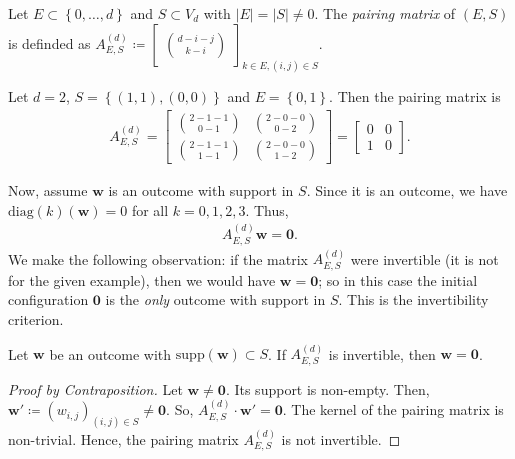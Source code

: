 \begin{definition}
    Let \( E \subset \left\{ 0, \dots, d \right\} \) and \( S \subset V_d \) with \( \lvert E \rvert = \lvert S \rvert \neq 0 \). The \emph{pairing matrix} of \( (E,S) \) is definded as \( A^{(d)}_{E,S} \coloneqq \begin{bmatrix} \binom{d-i-j}{k-i} \end{bmatrix}_{k \in E, (i,j) \in S} \).
\end{definition}

\begin{example}
    Let \( d = 2 \), \( S = \left\{ (1,1), (0,0) \right\} \) and \( E = \left\{ 0,1 \right\} \). Then the pairing matrix is
    \begin{align*}
        A^{(d)}_{E,S}  = \begin{bmatrix}
            \binom{2-1-1}{0-1} & \binom{2-0-0}{0-2} \\
            \binom{2-1-1}{1-1}  & \binom{2-0-0}{1-2}
        \end{bmatrix} = \begin{bmatrix}
            0 & 0 \\
            1 & 0
        \end{bmatrix}.
    \end{align*}

    Now, assume \( \mathbf{w} \) is an outcome with support in \( S \). Since it is an outcome, we have \( \mathrm{diag}(k)(\mathbf{w}) = 0 \) for all \( k = 0, 1,2,3 \). Thus, 
    \begin{align*}
        A^{(d)}_{E,S} \mathbf w = \mathbf 0.
    \end{align*}
    We make the following observation: if the matrix \( A^{(d)}_{E,S} \) were invertible (it is not for the given example), then we would have \( \mathbf w = \mathbf 0 \); so in this case the initial configuration \( \mathbf{0} \) is the \emph{only} outcome with support in \( S \). This is the invertibility criterion. 
\end{example}

\begin{proposition}
    Let \( \mathbf{w} \) be an outcome with \( \mathrm{supp}(\mathbf w) \subset S \).
    If \( A^{(d)}_{E,S} \) is invertible, then \( \mathbf{w} = \mathbf 0 \).
\end{proposition}

\begin{proof}[Proof by Contraposition]
    Let \( \mathbf{w} \neq \mathbf 0 \). Its support is non-empty. Then, \( \mathbf w' \coloneqq (w_{i,j})_{(i,j) \in S} \neq \mathbf 0 \). So, \( A^{(d)}_{E,S} \cdot \mathbf w' = \mathbf 0 \). The kernel of the pairing matrix is non-trivial. Hence, the pairing matrix \( A^{(d)}_{E,S} \) is not invertible.
\end{proof}

